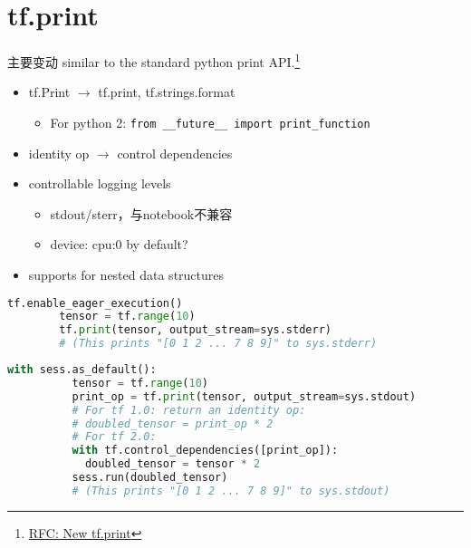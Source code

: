 
\section{tf.print}
\begin{frame}{主要变动}
    similar to the standard python print API.\footnote{\href{https://github.com/tensorflow/community/pull/14}{RFC: New tf.print}}


    \begin{itemize}
        \item tf.Print $\to$ tf.print, tf.strings.format
            \begin{itemize}
                \item For python 2: \lstinline{from __future__ import print_function}
            \end{itemize}
        \item identity op $\to$ control dependencies
        \item controllable logging levels
            \begin{itemize}
                \item stdout/sterr，与notebook不兼容
                \item device: cpu:0 by default?
            \end{itemize}
        \item supports for nested data structures
    \end{itemize}
\end{frame}

\begin{frame}[fragile]
    \begin{lstlisting}[language=Python,style=myScalastyle, caption=eager mode]
        tf.enable_eager_execution()
        tensor = tf.range(10)
        tf.print(tensor, output_stream=sys.stderr)
        # (This prints "[0 1 2 ... 7 8 9]" to sys.stderr)
    \end{lstlisting}

    \begin{lstlisting}[language=Python,style=myScalastyle, caption=graph mode]
        with sess.as_default():
          tensor = tf.range(10)
          print_op = tf.print(tensor, output_stream=sys.stdout)
          # For tf 1.0: return an identity op:
          # doubled_tensor = print_op * 2
          # For tf 2.0:
          with tf.control_dependencies([print_op]):
            doubled_tensor = tensor * 2
          sess.run(doubled_tensor)
          # (This prints "[0 1 2 ... 7 8 9]" to sys.stdout)
    \end{lstlisting}
\end{frame}

